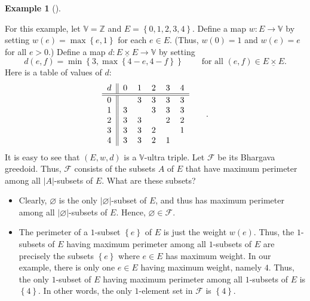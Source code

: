 \documentclass[numbers=enddot,12pt,final,onecolumn,notitlepage]{scrartcl}%
\theoremstyle{definition}
\newtheorem{exam}[theo]{Example}
\newenvironment{example}[1][]
{\begin{exam}[#1]\begin{leftbar}}
{\end{leftbar}\end{exam}}
\newcommand{\timesu}{\mathbin{\underline{\times}}}
\theoremstyle{plainsl}
\begin{document}
\begin{example}
\label{exa.bhargava.1}For this example, let $\mathbb{V}=\mathbb{Z}$ and
$E=\left\{  0,1,2,3,4\right\}  $. Define a map $w:E\rightarrow\mathbb{V}$ by
setting $w\left(  e\right)  =\max\left\{  e,1\right\}  $ for each $e\in E$.
(Thus, $w\left(  0\right)  =1$ and $w\left(  e\right)  =e$ for all $e>0$.)
Define a map $d:E\timesu E\rightarrow\mathbb{V}$ by setting
\[
d\left(  e,f\right)  =\min\left\{  3,\max\left\{  4-e,4-f\right\}  \right\}
\ \ \ \ \ \ \ \ \ \ \text{for all }\left(  e,f\right)  \in E\timesu E.
\]
Here is a table of values of $d$:%
\[%
\begin{tabular}
[c]{c||ccccc}%
$d$ & $0$ & $1$ & $2$ & $3$ & $4$\\\hline\hline
$0$ &  & $3$ & $3$ & $3$ & $3$\\
$1$ & $3$ &  & $3$ & $3$ & $3$\\
$2$ & $3$ & $3$ &  & $2$ & $2$\\
$3$ & $3$ & $3$ & $2$ &  & $1$\\
$4$ & $3$ & $3$ & $2$ & $1$ &
\end{tabular}
\ \ \ \ \ \ .
\]
It is easy to see that $\left(  E,w,d\right)  $ is a $\mathbb{V}$-ultra
triple. Let $\mathcal{F}$ be its Bhargava greedoid. Thus, $\mathcal{F}$
consists of the subsets $A$ of $E$ that have maximum perimeter among all
$\left\vert A\right\vert $-subsets of $E$. What are these subsets?

\begin{itemize}
\item Clearly, $\varnothing$ is the only $\left\vert \varnothing\right\vert
$-subset of $E$, and thus has maximum perimeter among all $\left\vert
\varnothing\right\vert $-subsets of $E$. Hence, $\varnothing\in\mathcal{F}$.

\item The perimeter of a $1$-subset $\left\{  e\right\}  $ of $E$ is just the
weight $w\left(  e\right)  $. Thus, the $1$-subsets of $E$ having maximum
perimeter among all $1$-subsets of $E$ are precisely the subsets $\left\{
e\right\}  $ where $e\in E$ has maximum weight. In our example, there is only
one $e\in E$ having maximum weight, namely $4$. Thus, the only $1$-subset of
$E$ having maximum perimeter among all $1$-subsets of $E$ is $\left\{
4\right\}  $. In other words, the only $1$-element set in $\mathcal{F}$ is
$\left\{  4\right\}  $.


\end{itemize}
\end{example}
\end{document}
